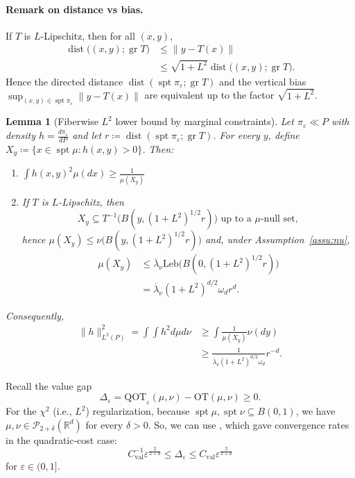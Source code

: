 \documentclass{article}
\theoremstyle{plain}
\newtheorem{lemma}[theorem]{Lemma}
\theoremstyle{definition}
\theoremstyle{remark}
\numberwithin{equation}{section}
\DeclareMathOperator{\spt}{spt}
\DeclareMathOperator{\gr}{gr}
\DeclareMathOperator{\dist}{dist}
\newcommand{\R}{\mathbb{R}}
\newcommand{\OT}{\mathrm{OT}}
\newcommand{\QOT}{\mathrm{QOT}}
\newcommand{\Leb}{\mathrm{Leb}}
\begin{document}
\paragraph{Remark on distance vs bias.}
If $T$ is $L$-Lipschitz, then for all $(x,y)$,
$$
\begin{aligned}
\dist\bigl((x,y);\gr T\bigr)&\le\|y-T(x)\|\\
&\le\sqrt{1+L^2}\dist\bigl((x,y);\gr T\bigr).
\end{aligned}
$$
Hence the directed distance $\dist(\spt\pi_\varepsilon;\gr T)$ and the vertical bias $\sup_{(x,y)\in\spt\pi_\varepsilon}\|y-T(x)\|$ are equivalent up to the factor $\sqrt{1+L^2}$.
\begin{lemma}[Fiberwise $L^2$ lower bound by marginal constraints]\label{lem:fiber-l2}
Let $\pi_\varepsilon\ll P$ with density $h=\frac{d\pi_\varepsilon}{dP}$ and let $r\coloneqq\dist(\spt\pi_\varepsilon;\gr T)$. 
For every $y$, define $X_y\coloneqq\{x\in\spt\mu:h(x,y)>0\}$. 
Then:
\begin{enumerate}
\item[(i)] $\int h(x,y)^2\mu(dx)\ge\frac{1}{\mu(X_y)}$
\item[(ii)] If $T$ is $L$-Lipschitz, then 
$$
X_y\subseteq T^{-1}\big(B(y,(1+L^2)^{1/2}r)\big)\text{ up to a $\mu$-null set},
$$
hence $\mu(X_y)\le\nu\big(B(y,(1+L^2)^{1/2}r)\big)$ and, under Assumption~\ref{assu:nu},
$$
\begin{aligned}
\mu(X_y)&\le\overline\lambda_\nu\Leb\big(B(0,(1+L^2)^{1/2}r)\big)\\
&=\overline\lambda_\nu(1+L^2)^{d/2}\omega_dr^d.
\end{aligned}
$$
\end{enumerate} 
Consequently,
\begin{equation}\label{eqn:fiber-global-L2}
\begin{aligned}
\big\|h\big\|_{L^2(P)}^2=\int\int h^2d\mu d\nu&\ge\int\frac{1}{\mu(X_y)}\nu(dy)\\
&\ge\frac{1}{\overline\lambda_\nu(1+L^2)^{d/2}\omega_d}r^{-d}.
\end{aligned}
\end{equation}
\end{lemma}


Recall the value gap
$$
\Delta_\varepsilon=\QOT_\varepsilon(\mu,\nu)-\OT(\mu,\nu)\ge0.
$$
For the $\chi^2$ (i.e., $L^2$) regularization, because $\spt\mu,\spt\nu\subseteq B(0,1)$, we have $\mu,\nu\in\mathcal P_{2+\delta}(\R^d)$ for every $\delta>0$. So, we can use \citealp[Corollary~3.1, Proposition~4.2]{eckstein2024convergence}, which gave convergence rates in the quadratic-cost case:
\begin{equation}\label{eqn:value-gap-rate}
C_\mathrm{val}^{-1}\varepsilon^{\frac{2}{2+d}}\le\Delta_\varepsilon\le C_\mathrm{val}\varepsilon^{\frac{2}{2+d}}
\end{equation}
for $\varepsilon\in (0,1]$.
\end{document}

